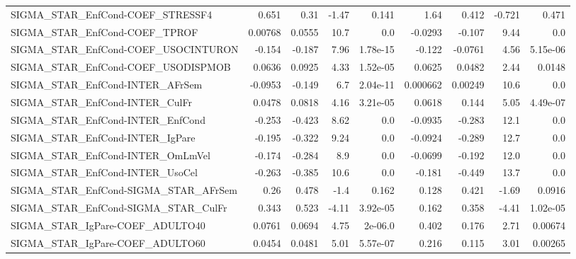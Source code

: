 \begin{tabular}{lrrrrrrrr}
SIGMA\_STAR\_EnfCond-COEF\_STRESSF4      &       0.651 &         0.31 &   -1.47 &    0.141 &       1.64 &       0.412 &       -0.721 &         0.471 \\
SIGMA\_STAR\_EnfCond-COEF\_TPROF         &     0.00768 &       0.0555 &    10.7 &      0.0 &    -0.0293 &      -0.107 &         9.44 &           0.0 \\
SIGMA\_STAR\_EnfCond-COEF\_USOCINTURON   &      -0.154 &       -0.187 &    7.96 & 1.78e-15 &     -0.122 &     -0.0761 &         4.56 &      5.15e-06 \\
SIGMA\_STAR\_EnfCond-COEF\_USODISPMOB    &      0.0636 &       0.0925 &    4.33 & 1.52e-05 &     0.0625 &      0.0482 &         2.44 &        0.0148 \\
SIGMA\_STAR\_EnfCond-INTER\_AFrSem       &     -0.0953 &       -0.149 &     6.7 & 2.04e-11 &   0.000662 &     0.00249 &         10.6 &           0.0 \\
SIGMA\_STAR\_EnfCond-INTER\_CulFr        &      0.0478 &       0.0818 &    4.16 & 3.21e-05 &     0.0618 &       0.144 &         5.05 &      4.49e-07 \\
SIGMA\_STAR\_EnfCond-INTER\_EnfCond      &      -0.253 &       -0.423 &    8.62 &      0.0 &    -0.0935 &      -0.283 &         12.1 &           0.0 \\
SIGMA\_STAR\_EnfCond-INTER\_IgPare       &      -0.195 &       -0.322 &    9.24 &      0.0 &    -0.0924 &      -0.289 &         12.7 &           0.0 \\
SIGMA\_STAR\_EnfCond-INTER\_OmLmVel      &      -0.174 &       -0.284 &     8.9 &      0.0 &    -0.0699 &      -0.192 &         12.0 &           0.0 \\
SIGMA\_STAR\_EnfCond-INTER\_UsoCel       &      -0.263 &       -0.385 &    10.6 &      0.0 &     -0.181 &      -0.449 &         13.7 &           0.0 \\
SIGMA\_STAR\_EnfCond-SIGMA\_STAR\_AFrSem  &        0.26 &        0.478 &    -1.4 &    0.162 &      0.128 &       0.421 &        -1.69 &        0.0916 \\
SIGMA\_STAR\_EnfCond-SIGMA\_STAR\_CulFr   &       0.343 &        0.523 &   -4.11 & 3.92e-05 &      0.162 &       0.358 &        -4.41 &      1.02e-05 \\
SIGMA\_STAR\_IgPare-COEF\_ADULTO40       &      0.0761 &       0.0694 &    4.75 &  2e-06.0 &      0.402 &       0.176 &         2.71 &       0.00674 \\
SIGMA\_STAR\_IgPare-COEF\_ADULTO60       &      0.0454 &       0.0481 &    5.01 & 5.57e-07 &      0.216 &       0.115 &         3.01 &       0.00265 \\

\end{tabular}
